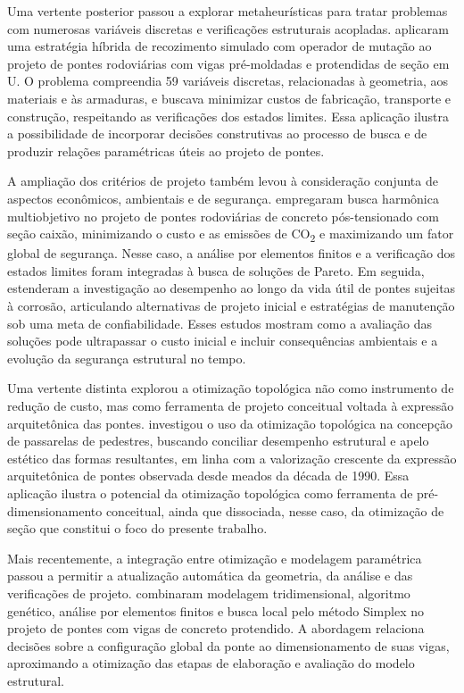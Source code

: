 Uma vertente posterior passou a explorar metaheurísticas para tratar problemas com numerosas variáveis discretas e verificações estruturais acopladas.
\textcite{Marti2013} aplicaram uma estratégia híbrida de recozimento simulado com operador de mutação ao projeto de pontes rodoviárias com vigas pré-moldadas e protendidas de seção em U.
O problema compreendia 59 variáveis discretas, relacionadas à geometria, aos materiais e às armaduras, e buscava minimizar custos de fabricação, transporte e construção, respeitando as verificações dos estados limites.
Essa aplicação ilustra a possibilidade de incorporar decisões construtivas ao processo de busca e de produzir relações paramétricas úteis ao projeto de pontes.

A ampliação dos critérios de projeto também levou à consideração conjunta de aspectos econômicos, ambientais e de segurança.
\textcite{GarciaSeguraYepes2016} empregaram busca harmônica multiobjetivo no projeto de pontes rodoviárias de concreto pós-tensionado com seção caixão, minimizando o custo e as emissões de CO\textsubscript{2} e maximizando um fator global de segurança.
Nesse caso, a análise por elementos finitos e a verificação dos estados limites foram integradas à busca de soluções de Pareto.
Em seguida, \textcite{GarciaSegura2017} estenderam a investigação ao desempenho ao longo da vida útil de pontes sujeitas à corrosão, articulando alternativas de projeto inicial e estratégias de manutenção sob uma meta de confiabilidade.
Esses estudos mostram como a avaliação das soluções pode ultrapassar o custo inicial e incluir consequências ambientais e a evolução da segurança estrutural no tempo.

Uma vertente distinta explorou a otimização topológica não como instrumento de redução de custo, mas como ferramenta de projeto conceitual voltada à expressão arquitetônica das pontes.
\textcite{vanBaalen2017} investigou o uso da otimização topológica na concepção de passarelas de pedestres, buscando conciliar desempenho estrutural e apelo estético das formas resultantes, em linha com a valorização crescente da expressão arquitetônica de pontes observada desde meados da década de 1990.
Essa aplicação ilustra o potencial da otimização topológica como ferramenta de pré-dimensionamento conceitual, ainda que dissociada, nesse caso, da otimização de seção que constitui o foco do presente trabalho.

Mais recentemente, a integração entre otimização e modelagem paramétrica passou a permitir a atualização automática da geometria, da análise e das verificações de projeto.
\textcite{deMoraes2025} combinaram modelagem tridimensional, algoritmo genético, análise por elementos finitos e busca local pelo método Simplex no projeto de pontes com vigas de concreto protendido.
A abordagem relaciona decisões sobre a configuração global da ponte ao dimensionamento de suas vigas, aproximando a otimização das etapas de elaboração e avaliação do modelo estrutural.

